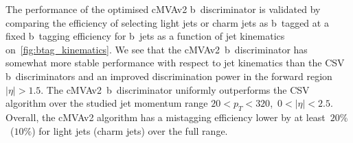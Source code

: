 The performance of the optimised cMVAv2 b~discriminator is validated by comparing the efficiency of selecting light jets or charm jets as b~tagged at a fixed b~tagging efficiency for b~jets as a function of jet kinematics on~\cref{fig:btag_kinematics}. We see that the cMVAv2~b~discriminator has somewhat more stable performance with respect to jet kinematics than the CSV b~discriminators and an improved discrimination power in the forward region $|\eta| > 1.5$. The cMVAv2~b~discriminator uniformly outperforms the CSV algorithm over the studied jet momentum range $20 < p_T < 320$,~$0 < |\eta| < 2.5$. Overall, the cMVAv2 algorithm has a mistagging efficiency lower by at least~$20\%$~($10\%$) for light jets (charm jets) over the full range.

\begin{figure}
\begin{centering}
 \\

\end{centering}
\end{figure}
